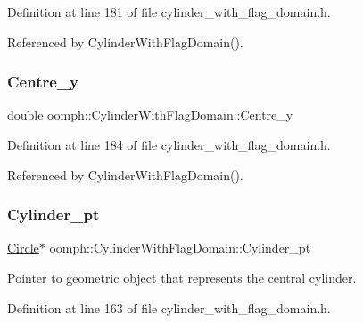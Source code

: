 Definition at line 181 of file cylinder\+\_\+with\+\_\+flag\+\_\+domain.\+h.



Referenced by Cylinder\+With\+Flag\+Domain().

\mbox{\label{classoomph_1_1CylinderWithFlagDomain_aee096a172eec5ffc3719b625c52beb26}} 
\subsubsection{\texorpdfstring{Centre\+\_\+y}{Centre\_y}}
{\footnotesize\ttfamily double oomph\+::\+Cylinder\+With\+Flag\+Domain\+::\+Centre\+\_\+y\hspace{0.3cm}{\ttfamily [private]}}



Definition at line 184 of file cylinder\+\_\+with\+\_\+flag\+\_\+domain.\+h.



Referenced by Cylinder\+With\+Flag\+Domain().

\mbox{\label{classoomph_1_1CylinderWithFlagDomain_afb13bdcd16005bc0505908bb3c844f33}} 
\subsubsection{\texorpdfstring{Cylinder\+\_\+pt}{Cylinder\_pt}}
{\footnotesize\ttfamily \hyperlink{classoomph_1_1Circle}{Circle}$\ast$ oomph\+::\+Cylinder\+With\+Flag\+Domain\+::\+Cylinder\+\_\+pt\hspace{0.3cm}{\ttfamily [private]}}



Pointer to geometric object that represents the central cylinder. 



Definition at line 163 of file cylinder\+\_\+with\+\_\+flag\+\_\+domain.\+h.



